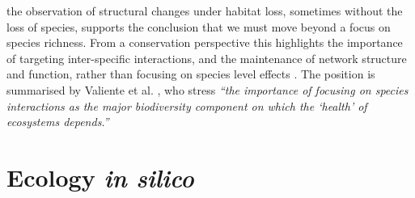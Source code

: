  the observation of structural changes under habitat loss, sometimes without the loss of species, supports the conclusion that we must move beyond a focus on species richness. From a conservation perspective this highlights the importance of targeting inter-specific interactions, and the maintenance of network structure and function, rather than focusing on species level effects \cite{memmott2007conservation}. The position is summarised by Valiente et al. \cite{valiente2015beyond}, who stress \emph{``the importance of focusing on species interactions as the major biodiversity component on which the `health' of ecosystems depends.''}



%
%




\section{Ecology \emph{in silico}}
\label{sec:intro_computers}


